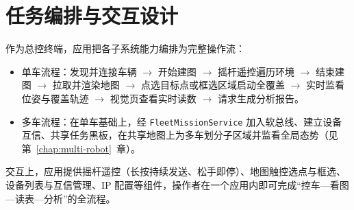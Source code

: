 \section{任务编排与交互设计}
\label{sec:task-orchestration}

作为总控终端，应用把各子系统能力编排为完整操作流：

\begin{itemize}
\item 单车流程：发现并连接车辆 $\to$ 开始建图 $\to$ 摇杆遥控遍历环境 $\to$ 结束建图 $\to$ 拉取并渲染地图 $\to$ 点选目标点或框选区域启动全覆盖 $\to$ 实时监看位姿与覆盖轨迹 $\to$ 视觉页查看实时读数 $\to$ 请求生成分析报告。
\item 多车流程：在单车基础上，经 \texttt{FleetMissionService} 加入软总线、建立设备互信、共享任务黑板，在共享地图上为多车划分子区域并监看全局态势（见第~\ref{chap:multi-robot}~章）。
\end{itemize}

交互上，应用提供摇杆遥控（长按持续发送、松手即停）、地图触控选点与框选、设备列表与互信管理、IP 配置等组件，操作者在一个应用内即可完成“控车—看图—读表—分析”的全流程。
